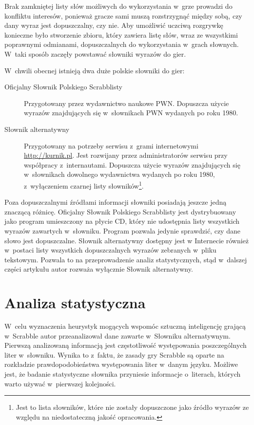 \documentclass[a4paper,twocolumn,12pt]{article}
\theoremstyle{definition}
\begin{document}
Brak zamkniętej listy słów możliwych do wykorzystania w~grze prowadzi do konfliktu interesów, ponieważ gracze sami muszą rozstrzygnąć między sobą, czy dany wyraz jest dopuszczalny, czy nie. Aby umożliwić uczciwą rozgrywkę konieczne było stworzenie zbioru, który zawiera listę słów, wraz ze wszystkimi poprawnymi odmianami, dopuszczalnych do wykorzystania w~grach słownych. W~taki sposób zaczęły powstawać słowniki wyrazów do gier. \cite{game_dictionary_definition}

W~chwili obecnej istnieją dwa duże polskie słowniki do gier:

\begin{description}
 \item [Oficjalny Słownik Polskiego Scrabblisty] Przygotowany przez wydawnictwo naukowe PWN. Dopuszcza użycie wyrazów znajdujących się w~słownikach PWN wydanych po roku 1980.
 \item[Słownik alternatywny] Przygotowany na potrzeby serwisu z~grami internetowymi \url{http://kurnik.pl}. Jest rozwijany przez administratorów serwisu przy współpracy z~internautami. Dopuszcza użycie wyrazów znajdujących się w~słownikach dowolnego wydawnictwa wydanych po roku 1980, z~wyłączeniem czarnej listy słowników\footnote{Jest to lista słowników, które nie zostały dopuszczone jako źródło wyrazów ze względu na niedostateczną jakość opracowania.}. 
\end{description}

Poza dopuszczalnymi źródłami informacji słowniki posiadają jeszcze jedną znaczącą różnicę. Oficjalny Słownik Polskiego Scrabblisty jest dystrybuowany jako program umieszczony na płycie CD, który nie udostępnia listy wszystkich wyrazów zawartych w~słowniku. Program pozwala jedynie sprawdzić, czy dane słowo jest dopuszczalne. Słownik alternatywny dostępny jest w Internecie również w~postaci listy wszystkich dopuszczalnych wyrazów zebranych w~pliku tekstowym. Pozwala to na przeprowadzenie analiz statystycznych, stąd w~dalszej części artykułu autor rozważa wyłącznie Słownik alternatywny.

\section*{Analiza statystyczna}

W~celu wyznaczenia heurystyk mogących wspomóc sztuczną inteligencję grającą w~Scrabble autor przeanalizował dane zawarte w~Słowniku alternatywnym. Pierwszą analizowaną informacją jest częstotliwość występowania poszczególnych liter w~słowniku. Wynika to z~faktu, że zasady gry Scrabble są oparte na rozkładzie prawdopodobieństwa występowania liter w~danym języku. Możliwe jest, że badanie statystyczne słownika przyniesie informacje o~literach, których warto używać w~pierwszej kolejności.
\end{document}
